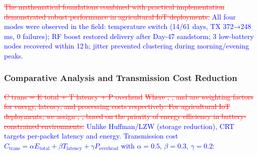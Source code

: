 \documentclass[pdflatex,sn-mathphys-num]{sn-jnl}
\theoremstyle{thmstyleone}
\theoremstyle{thmstyletwo}
\theoremstyle{thmstylethree}
\begin{document}
{\textcolor{red}{\sout{The mathematical foundations combined with practical implementation demonstrated robust performance in agricultural IoT deployments.}}
\textcolor{blue}{All four modes were observed in the field: temperature switch (14/61 days, TX 372→248\,ms, 0 failures); RF boost restored delivery after Day-47 sandstorm; 3 low-battery nodes recovered within 12\,h; jitter prevented clustering during morning/evening peaks.}

\subsubsection{Comparative Analysis and Transmission Cost Reduction}
\label{subsubsec:compression_comparison}

\textcolor{red}{\sout{C trans = E total + T latency + P overhead}}
\textcolor{red}{\sout{Where , , and are weighting factors for energy, latency, and processing costs respectively. For agricultural IoT deployments, we assign , , based on the priority of energy efficiency in battery-constrained environments.}}
\textcolor{blue}{Unlike Huffman/LZW (storage reduction), CRT targets per-packet latency and energy. Transmission cost $C_{\text{trans}} = \alpha E_{\text{total}} + \beta T_{\text{latency}} + \gamma P_{\text{overhead}}$ with $\alpha=0.5$, $\beta=0.3$, $\gamma=0.2$:}

}
\end{document}
